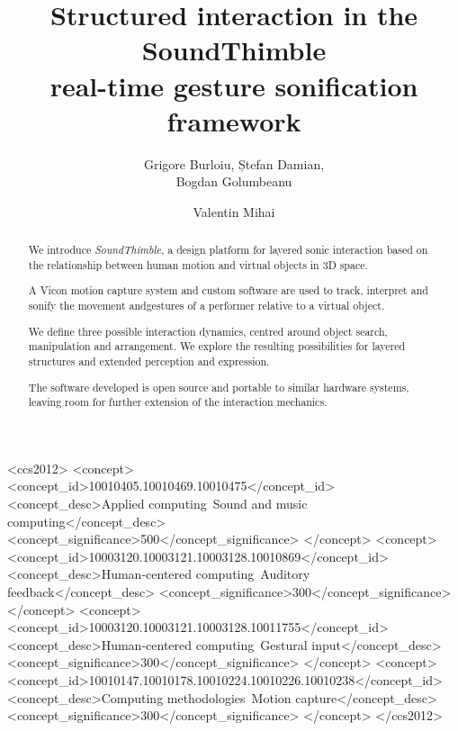 \documentclass[sigchi]{acmart}
\begin{document}
\title{Structured interaction in the SoundThimble\\ real-time gesture sonification framework}

\author{Grigore Burloiu, Ștefan Damian,\\ Bogdan Golumbeanu}

\author{Valentin Mihai}


\begin{abstract}
We introduce \textit{SoundThimble}, a design platform for layered sonic interaction based on the relationship between human motion and virtual objects in 3D space.

A Vicon motion capture system and custom software are used to track, interpret and sonify the movement and\linebreak gestures of a performer relative to a virtual object.

We define three possible interaction dynamics, centred around object search, manipulation and arrangement. We explore the resulting possibilities for layered structures and extended perception and expression.

The software developed is open source and portable to similar hardware systems, leaving room for further extension of the interaction mechanics.
\end{abstract}

%
%
\begin{CCSXML}
 <ccs2012>
 <concept>
 <concept_id>10010405.10010469.10010475</concept_id>
 <concept_desc>Applied computing~Sound and music computing</concept_desc>
 <concept_significance>500</concept_significance>
 </concept>
 <concept>
 <concept_id>10003120.10003121.10003128.10010869</concept_id>
 <concept_desc>Human-centered computing~Auditory feedback</concept_desc>
 <concept_significance>300</concept_significance>
 </concept>
 <concept>
 <concept_id>10003120.10003121.10003128.10011755</concept_id>
 <concept_desc>Human-centered computing~Gestural input</concept_desc>
 <concept_significance>300</concept_significance>
 </concept>
 <concept>
 <concept_id>10010147.10010178.10010224.10010226.10010238</concept_id>
 <concept_desc>Computing methodologies~Motion capture</concept_desc>
 <concept_significance>300</concept_significance>
 </concept>
 </ccs2012>
\end{CCSXML}
\end{document}
